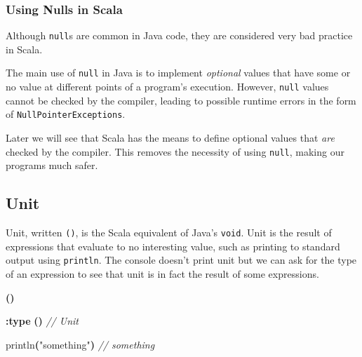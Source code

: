 \documentclass[11pt,a5paper,]{book}
\newenvironment{Shaded}{\begin{snugshade}}{\end{snugshade}}
\newcommand{\CommentTok}[1]{\textcolor[rgb]{0.56,0.35,0.01}{\textit{#1}}}
\newcommand{\FunctionTok}[1]{\textcolor[rgb]{0.00,0.00,0.00}{#1}}
\newcommand{\KeywordTok}[1]{\textcolor[rgb]{0.13,0.29,0.53}{\textbf{#1}}}
\newcommand{\OperatorTok}[1]{\textcolor[rgb]{0.81,0.36,0.00}{\textbf{#1}}}
\newcommand{\StringTok}[1]{\textcolor[rgb]{0.31,0.60,0.02}{#1}}
\begin{document}
\hypertarget{using-nulls-in-scala}{%
\subsubsection*{Using Nulls in Scala}\label{using-nulls-in-scala}}

Although \texttt{null}s are common in Java code, they are considered
very bad practice in Scala.

The main use of \texttt{null} in Java is to implement \emph{optional}
values that have some or no value at different points of a program's
execution. However, \texttt{null} values cannot be checked by the
compiler, leading to possible runtime errors in the form of
\texttt{NullPointerExceptions}.

Later we will see that Scala has the means to define optional values
that \emph{are} checked by the compiler. This removes the necessity of
using \texttt{null}, making our programs much safer.

\hypertarget{unit}{%
\subsection{Unit}\label{unit}}

Unit, written \texttt{()}, is the Scala equivalent of Java's
\texttt{void}. Unit is the result of expressions that evaluate to no
interesting value, such as printing to standard output using
\texttt{println}. The console doesn't print unit but we can ask for the
type of an expression to see that unit is in fact the result of some
expressions.

\begin{Shaded}
\begin{Highlighting}[]
\OperatorTok{()}
\end{Highlighting}
\end{Shaded}

\begin{Shaded}
\begin{Highlighting}[]
\OperatorTok{:}\KeywordTok{type} \OperatorTok{()}
\CommentTok{// Unit}
\end{Highlighting}
\end{Shaded}

\begin{Shaded}
\begin{Highlighting}[]
\FunctionTok{println}\OperatorTok{(}\StringTok{"something"}\OperatorTok{)}
\CommentTok{// something}
\end{Highlighting}
\end{Shaded}
\end{document}

